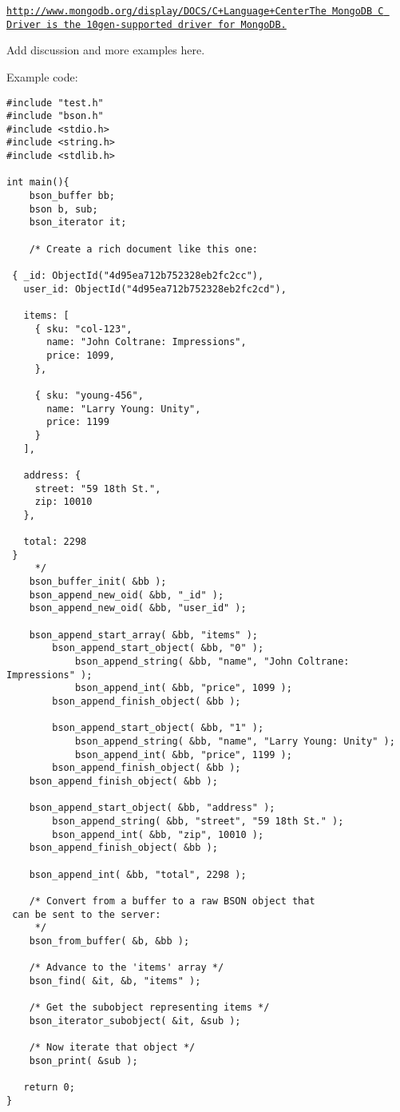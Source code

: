 \href{http://www.mongodb.org/display/DOCS/C+Language+CenterThe}\tt{http://www.mongodb.org/display/DOCS/C+Language+Center\-The} Mongo\-DB C Driver is the 10gen-supported driver for Mongo\-DB.

Add discussion and more examples here.

Example code:



\begin{Code}\begin{verbatim}#include "test.h"
#include "bson.h"
#include <stdio.h>
#include <string.h>
#include <stdlib.h>

int main(){
    bson_buffer bb;
    bson b, sub;
    bson_iterator it;

    /* Create a rich document like this one:

 { _id: ObjectId("4d95ea712b752328eb2fc2cc"),
   user_id: ObjectId("4d95ea712b752328eb2fc2cd"),

   items: [
     { sku: "col-123",
       name: "John Coltrane: Impressions",
       price: 1099,
     },

     { sku: "young-456",
       name: "Larry Young: Unity",
       price: 1199
     }
   ],

   address: {
     street: "59 18th St.",
     zip: 10010
   },

   total: 2298
 }
     */
    bson_buffer_init( &bb );
    bson_append_new_oid( &bb, "_id" );
    bson_append_new_oid( &bb, "user_id" );

    bson_append_start_array( &bb, "items" );
        bson_append_start_object( &bb, "0" );
            bson_append_string( &bb, "name", "John Coltrane: Impressions" );
            bson_append_int( &bb, "price", 1099 );
        bson_append_finish_object( &bb );

        bson_append_start_object( &bb, "1" );
            bson_append_string( &bb, "name", "Larry Young: Unity" );
            bson_append_int( &bb, "price", 1199 );
        bson_append_finish_object( &bb );
    bson_append_finish_object( &bb );

    bson_append_start_object( &bb, "address" );
        bson_append_string( &bb, "street", "59 18th St." );
        bson_append_int( &bb, "zip", 10010 );
    bson_append_finish_object( &bb );

    bson_append_int( &bb, "total", 2298 );

    /* Convert from a buffer to a raw BSON object that
 can be sent to the server:
     */
    bson_from_buffer( &b, &bb );

    /* Advance to the 'items' array */
    bson_find( &it, &b, "items" );

    /* Get the subobject representing items */
    bson_iterator_subobject( &it, &sub );

    /* Now iterate that object */
    bson_print( &sub );

   return 0;
}
\end{verbatim}\end{Code}

 